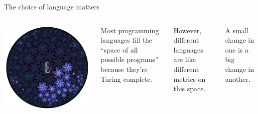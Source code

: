 \documentclass{beamer}
\begin{document}
\begin{frame}{The choice of language matters}

\vspace{0.5 cm}
\begin{columns}
\includegraphics[width=\linewidth]{space-of-programs.png}

Most programming languages fill the ``space of all possible programs'' because they're Turing complete.

\vspace{0.25 cm}
However, different languages are like different metrics on this space.

\vspace{0.25 cm}
A small change in one is a big change in another.
\end{columns}
\end{frame}
\end{document}
